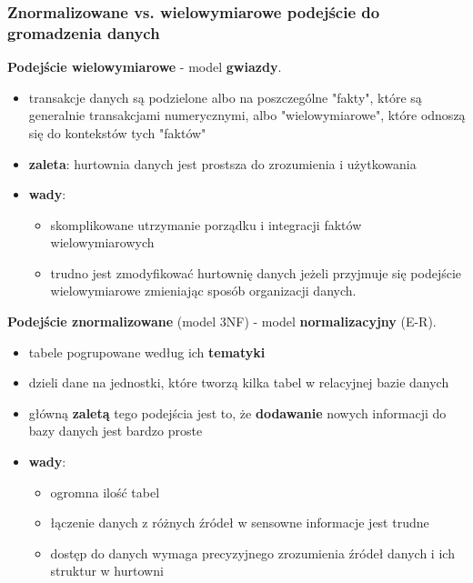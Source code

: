 \documentclass[a4paper]{article}
\begin{document}
    \subsubsection{Znormalizowane vs. wielowymiarowe podejście do gromadzenia danych}
    \textbf{Podejście wielowymiarowe} - model \textbf{gwiazdy}.
    \begin{itemize}
        \item transakcje danych są podzielone albo na poszczególne "fakty", które są generalnie transakcjami numerycznymi, albo "wielowymiarowe", które odnoszą się do kontekstów tych "faktów"
        \item \textbf{zaleta}: hurtownia danych jest prostsza do zrozumienia i użytkowania
        \item \textbf{wady}:
        \begin{itemize}
            \item skomplikowane utrzymanie porządku i integracji faktów wielowymiarowych
            \item trudno jest zmodyfikować hurtownię danych jeżeli przyjmuje się podejście wielowymiarowe zmieniając sposób
            organizacji danych.
        \end{itemize}
    \end{itemize}

    \textbf{Podejście znormalizowane} (model 3NF) - model \textbf{normalizacyjny} (E-R).
    \begin{itemize}
        \item tabele pogrupowane według ich \textbf{tematyki}
        \item dzieli dane na jednostki, które tworzą kilka tabel w relacyjnej
        bazie danych
        \item główną \textbf{zaletą} tego podejścia jest to, że \textbf{dodawanie} nowych informacji
        do bazy danych jest bardzo proste
        \item \textbf{wady}:
        \begin{itemize}
            \item ogromna ilość tabel
            \item łączenie danych z różnych źródeł w sensowne informacje jest trudne
            \item dostęp do danych wymaga precyzyjnego zrozumienia źródeł danych i ich struktur w hurtowni
        \end{itemize}
    \end{itemize}
\end{document}
